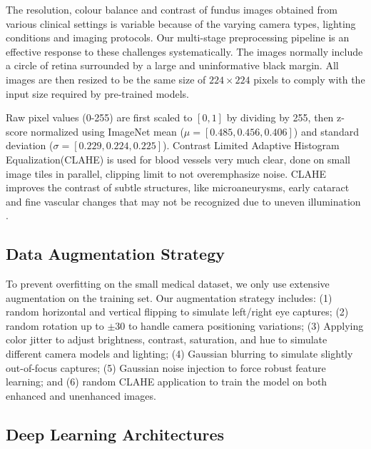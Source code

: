 \documentclass[conference]{IEEEtran}
\begin{document}
{{The resolution, colour balance and contrast of fundus images obtained from various clinical settings is variable because of the varying camera types, lighting conditions and imaging protocols. Our multi-stage preprocessing pipeline is an effective response to these challenges systematically. The images normally include a circle of retina surrounded by a large and uninformative black margin. All images are then resized to be the same size of $224 \times 224$ pixels to comply with the input size required by pre-trained models.

Raw pixel values (0-255) are first scaled to $[0, 1]$ by dividing by 255, then z-score normalized using ImageNet mean ($\mu = [0.485, 0.456, 0.406]$) and standard deviation ($\sigma = [0.229, 0.224, 0.225]$). Contrast Limited Adaptive Histogram Equalization(CLAHE) is used for blood vessels very much clear, done on small image tiles in parallel, clipping limit to not overemphasize noise. CLAHE improves the contrast of subtle structures, like microaneurysms, early cataract and fine vascular changes that may not be recognized due to uneven illumination \cite{paper2, paper15}.



\subsection{Data Augmentation Strategy}

To prevent overfitting on the small medical dataset, we only use extensive augmentation on the training set. Our augmentation strategy includes: (1) random horizontal and vertical flipping to simulate left/right eye captures; (2) random rotation up to $\pm$30\textdegree{} to handle camera positioning variations; (3) Applying color jitter to adjust brightness, contrast, saturation, and hue to simulate different camera models and lighting; (4) Gaussian blurring to simulate slightly out-of-focus captures; (5) Gaussian noise injection to force robust feature learning; and (6) random CLAHE application to train the model on both enhanced and unenhanced images.

\subsection{Deep Learning Architectures}

}}
\end{document}
